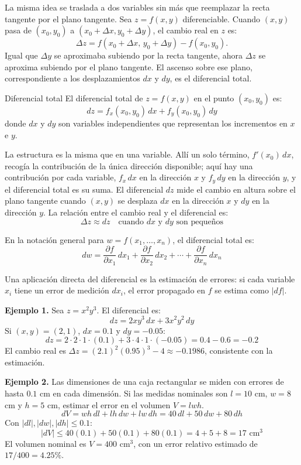 La misma idea se traslada a dos variables sin más que reemplazar la recta tangente por el plano tangente. Sea $z = f(x, y)$ diferenciable. Cuando $(x, y)$ pasa de $(x_0, y_0)$ a $(x_0 + \Delta x, y_0 + \Delta y)$, el cambio real en $z$ es:
\[
\Delta z = f(x_0 + \Delta x,\, y_0 + \Delta y) - f(x_0, y_0).
\]
Igual que $\Delta y$ se aproximaba subiendo por la recta tangente, ahora $\Delta z$ se aproxima subiendo por el plano tangente. El ascenso sobre ese plano, correspondiente a los desplazamientos $dx$ y $dy$, es el diferencial total.

\begin{mydefinition}{Diferencial total}
El diferencial total de $z = f(x, y)$ en el punto $(x_0, y_0)$ es:
\[
dz = f_x(x_0, y_0)\,dx + f_y(x_0, y_0)\,dy
\]
donde $dx$ y $dy$ son variables independientes que representan los incrementos en $x$ e $y$.
\end{mydefinition}

La estructura es la misma que en una variable. Allí un solo término, $f'(x_0)\,dx$, recogía la contribución de la única dirección disponible; aquí hay una contribución por cada variable, $f_x\,dx$ en la dirección $x$ y $f_y\,dy$ en la dirección $y$, y el diferencial total es su suma. El diferencial $dz$ mide el cambio en altura sobre el plano tangente cuando $(x, y)$ se desplaza $dx$ en la dirección $x$ y $dy$ en la dirección $y$. La relación entre el cambio real y el diferencial es:
\[
\Delta z \approx dz \quad \text{cuando } dx \text{ y } dy \text{ son pequeños}
\]

En la notación general para $w = f(x_1, \dots, x_n)$, el diferencial total es:
\[
dw = \frac{\partial f}{\partial x_1}\,dx_1 + \frac{\partial f}{\partial x_2}\,dx_2 + \cdots + \frac{\partial f}{\partial x_n}\,dx_n
\]

Una aplicación directa del diferencial es la estimación de errores: si cada variable $x_i$ tiene un error de medición $dx_i$, el error propagado en $f$ se estima como $|df|$.

\textbf{Ejemplo 1.} Sea $z = x^2 y^3$. El diferencial es:
\[
dz = 2xy^3\,dx + 3x^2 y^2\,dy
\]
Si $(x, y) = (2, 1)$, $dx = 0.1$ y $dy = -0.05$:
\[
dz = 2 \cdot 2 \cdot 1 \cdot (0.1) + 3 \cdot 4 \cdot 1 \cdot (-0.05) = 0.4 - 0.6 = -0.2
\]
El cambio real es $\Delta z = (2.1)^2(0.95)^3 - 4 \approx -0.1986$, consistente con la estimación.

\textbf{Ejemplo 2.} Las dimensiones de una caja rectangular se miden con errores de hasta $0.1$ cm en cada dimensión. Si las medidas nominales son $l = 10$ cm, $w = 8$ cm y $h = 5$ cm, estimar el error en el volumen $V = lwh$.
\[
dV = wh\,dl + lh\,dw + lw\,dh = 40\,dl + 50\,dw + 80\,dh
\]
Con $|dl|, |dw|, |dh| \leq 0.1$:
\[
|dV| \leq 40(0.1) + 50(0.1) + 80(0.1) = 4 + 5 + 8 = 17 \text{ cm}^3
\]
El volumen nominal es $V = 400$ cm$^3$, con un error relativo estimado de $17/400 = 4.25\%$.

